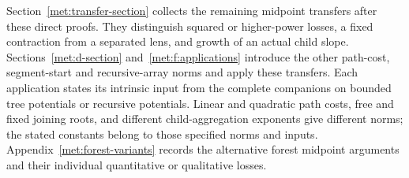 Section~\ref{met:transfer-section} collects the remaining midpoint
transfers after these direct proofs.
They distinguish squared or higher-power losses, a fixed contraction from
a separated lens, and growth of an actual child slope.
Sections~\ref{met:d-section} and~\ref{met:f:applications} introduce the
other path-cost, segment-start and recursive-array norms and apply these
transfers. Each application states its intrinsic input from the complete
companions on bounded tree potentials or recursive potentials. Linear
and quadratic path costs, free and fixed joining roots, and different
child-aggregation exponents give different norms; the stated constants
belong to those specified norms and inputs.
Appendix~\ref{met:forest-variants} records the alternative forest
midpoint arguments and their individual quantitative or qualitative losses.
